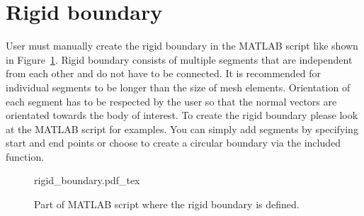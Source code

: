 \documentclass[10pt,a4paper]{article}
\begin{document}
\section{Rigid boundary}

User must manually create the rigid boundary in the MATLAB script like shown in Figure~\ref{im:rigid_boundary}. Rigid boundary consists of multiple segments that are independent from each other and do not have to be connected. It is recommended for individual segments to be longer than the size of mesh elements. Orientation of each segment has to be respected by the user so that the normal vectors are orientated towards the body of interest. To create the rigid boundary please look at the MATLAB script for examples. You can simply add segments by specifying start and end points or choose to create a circular boundary via the included function.

\begin{figure}[ht]
	\centering
	\footnotesize
    \def\svgwidth{0.9\textwidth}{rigid_boundary.pdf_tex}
	\caption{Part of MATLAB script where the rigid boundary is defined.}
	\label{im:rigid_boundary}
\end{figure}
\end{document}
